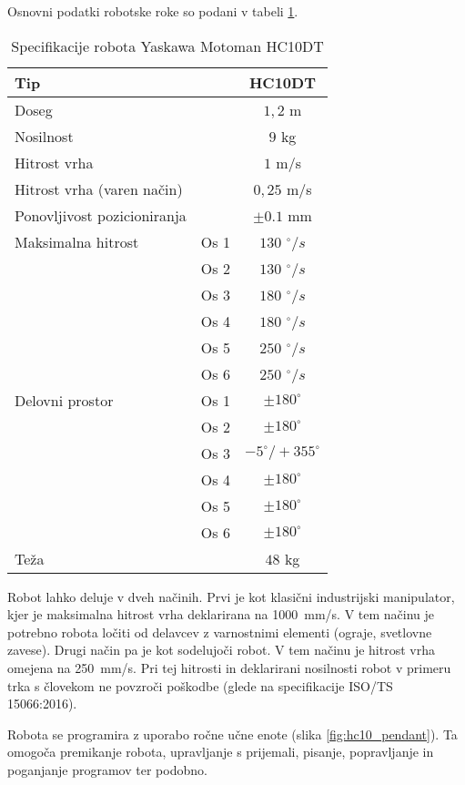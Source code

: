 Osnovni podatki robotske roke so podani v tabeli \ref{tab:hc10}.

\begin{table}
	\centering
	\caption{Specifikacije robota Yaskawa Motoman HC10DT} \label{tab:hc10}
	\begin{tabular}{|lr|c|}
		\hline   Tip &  & HC10DT \\
		\hline Doseg & & $1,2$ m \\
		\hline Nosilnost  & & $9$ kg \\
		\hline Hitrost vrha& & $1$ m/s \\
		\hline Hitrost vrha (varen način)& & $0,25$ m/s \\
		\hline Ponovljivost pozicioniranja& & $\pm 0.1$ mm \\
		\hline Maksimalna hitrost
		& Os 1 & $130$ $^\circ/s$ \\
		& Os 2 & $130$ $^\circ/s$ \\
		& Os 3 & $180$ $^\circ/s$ \\
		& Os 4 & $180$ $^\circ/s$ \\
		& Os 5 & $250$ $^\circ/s$ \\
		& Os 6 & $250$ $^\circ/s$ \\
		\hline Delovni prostor
		& Os 1 & $\pm180^\circ$\\
		& Os 2 & $\pm180^\circ$\\
		& Os 3 & $-5^\circ/+355^\circ$\\
		& Os 4 & $\pm180^\circ$\\
		& Os 5 & $\pm180^\circ$\\
		& Os 6 & $\pm180^\circ$\\
		\hline   Teža &  & $48$ kg \\
		\hline
	\end{tabular}
\end{table}

Robot lahko deluje v dveh načinih. Prvi je kot klasični industrijski manipulator, kjer je maksimalna hitrost vrha deklarirana na 1000~mm/s. V tem načinu je potrebno robota ločiti od delavcev z varnostnimi elementi (ograje, svetlovne zavese). Drugi način pa je kot sodelujoči robot. V tem načinu je hitrost vrha omejena na 250~mm/s. Pri tej hitrosti in deklarirani nosilnosti robot v primeru trka s človekom ne povzroči poškodbe (glede na specifikacije ISO/TS 15066:2016).

Robota se programira z uporabo ročne učne enote (slika \ref{fig:hc10_pendant}). Ta omogoča premikanje robota, upravljanje s prijemali, pisanje, popravljanje in poganjanje programov ter podobno.

